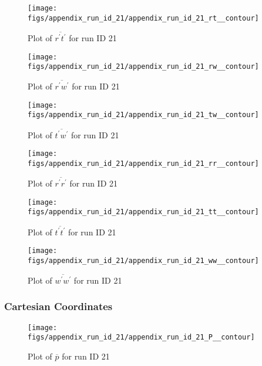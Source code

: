 \begin{figure}[H]
\centering
\texttt{[image: figs/appendix\_run\_id\_21/appendix\_run\_id\_21\_rt\_\_contour]}
\caption{Plot of $\overline{r^\prime t^\prime}$ for run ID 21}
\label{fig:appendix_run_id_21_rt__contour}
\end{figure}


\begin{figure}[H]
\centering
\texttt{[image: figs/appendix\_run\_id\_21/appendix\_run\_id\_21\_rw\_\_contour]}
\caption{Plot of $\overline{r^\prime w^\prime}$ for run ID 21}
\label{fig:appendix_run_id_21_rw__contour}
\end{figure}


\begin{figure}[H]
\centering
\texttt{[image: figs/appendix\_run\_id\_21/appendix\_run\_id\_21\_tw\_\_contour]}
\caption{Plot of $\overline{t^\prime w^\prime}$ for run ID 21}
\label{fig:appendix_run_id_21_tw__contour}
\end{figure}


\begin{figure}[H]
\centering
\texttt{[image: figs/appendix\_run\_id\_21/appendix\_run\_id\_21\_rr\_\_contour]}
\caption{Plot of $\overline{r^\prime r^\prime}$ for run ID 21}
\label{fig:appendix_run_id_21_rr__contour}
\end{figure}


\begin{figure}[H]
\centering
\texttt{[image: figs/appendix\_run\_id\_21/appendix\_run\_id\_21\_tt\_\_contour]}
\caption{Plot of $\overline{t^\prime t^\prime}$ for run ID 21}
\label{fig:appendix_run_id_21_tt__contour}
\end{figure}


\begin{figure}[H]
\centering
\texttt{[image: figs/appendix\_run\_id\_21/appendix\_run\_id\_21\_ww\_\_contour]}
\caption{Plot of $\overline{w^\prime w^\prime}$ for run ID 21}
\label{fig:appendix_run_id_21_ww__contour}
\end{figure}


\subsubsection{Cartesian Coordinates}
\begin{figure}[H]
\centering
\texttt{[image: figs/appendix\_run\_id\_21/appendix\_run\_id\_21\_P\_\_contour]}
\caption{Plot of $\overline{p}$ for run ID 21}
\label{fig:appendix_run_id_21_P__contour}
\end{figure}


